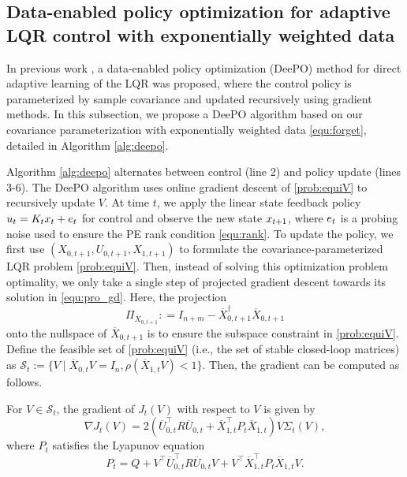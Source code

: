 \subsection{Data-enabled policy optimization for adaptive LQR control with exponentially weighted data}
In previous work \cite{zhao2023data,zhao2024data}, a data-enabled policy optimization (DeePO) method for direct adaptive learning of the LQR was proposed, where the control policy is parameterized by sample covariance and updated recursively using gradient methods. In this subsection, we propose a DeePO algorithm based on our covariance parameterization with exponentially weighted data \eqref{equ:forget}, detailed in Algorithm \ref{alg:deepo}.

Algorithm \ref{alg:deepo} alternates between control (line 2) and policy update (lines 3-6).
The DeePO algorithm uses online gradient descent of \eqref{prob:equiV} to recursively update $V$. 
At time $t$, we apply the linear state feedback policy $u_{t}=K_tx_{t}  + e_{t} $ for control and observe the new state $x_{t+1} $, where $e_{t}$ is a probing noise used to ensure the PE rank condition \eqref{equ:rank}. To update the policy, we first use $(X_{0,t+1}, U_{0,t+1}, X_{1,t+1})$ to formulate the covariance-parameterized LQR problem \eqref{prob:equiV}. Then, instead of solving this optimization problem optimality, we only take a single step of projected gradient descent towards its solution in \eqref{equ:pro_gd}. Here, the projection  
\begin{equation}
\Pi_{\overline{X}_{0,t+1}}: = I_{n+m}-\overline{X}_{0,t+1}^{\dagger}\overline{X}_{0,t+1}
\end{equation}
onto the nullspace of $\overline{X}_{0,t+1}$ is to ensure the subspace constraint in \eqref{prob:equiV}.
 Define the feasible set of \eqref{prob:equiV} (i.e., the set of stable closed-loop matrices) as $\mathcal{S}_t:= \{V\mid \overline{X}_{0,t}V =I_n,  \rho (\overline{X}_{1,t}V)<1\}$. Then, the gradient can be computed as follows.
\begin{lemma}\label{lem:gradient}
For $V\in \mathcal{S}_t$, the gradient of $J_t(V)$ with respect to $V$ is given by
	\begin{equation}\label{equ:pg}
	\nabla J_t(V) = 2 \left(\overline{U}_{0,t}^{\top}R\overline{U}_{0,t}+\overline{X}_{1,t}^{\top}P_t\overline{X}_{1,t}\right)V \Sigma_t(V),
	\end{equation}
	where $P_t$ satisfies the Lyapunov equation 
	\begin{equation}
	P_t = Q + V^{\top}\overline{U}_{0,t}^{\top}R\overline{U}_{0,t}V + V^{\top}\overline{X}_{1,t}^{\top}P_t\overline{X}_{1,t}V.
	\end{equation}
\end{lemma}
 


